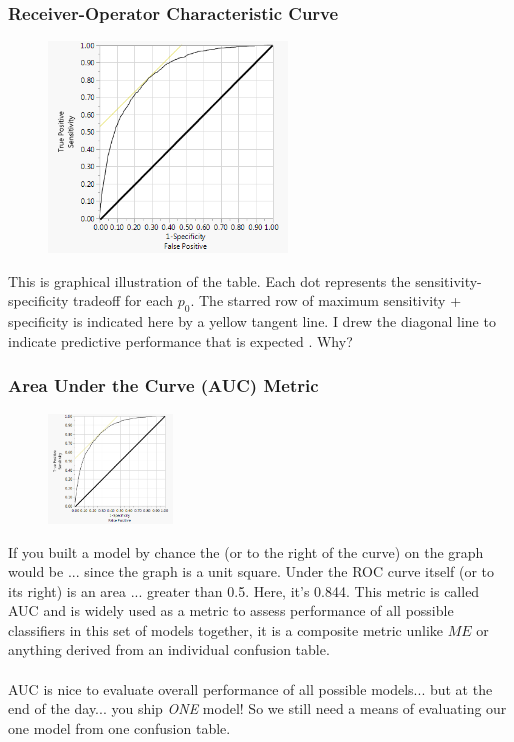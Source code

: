 \documentclass[handout]{beamer}
\begin{document}
\begin{frame}\frametitle{Receiver-Operator Characteristic Curve}

\vspace{-0.2cm}
\begin{figure}
\centering
\hspace{-0.5cm}\includegraphics[width=2.5in]{roc_curve.png}
\end{figure}

\small
\vspace{-0.3cm}
This is graphical illustration of the table. Each dot represents the sensitivity-specificity tradeoff for each $p_0$. \pause The starred row of maximum sensitivity + specificity is indicated here by a yellow tangent line. \pause I drew the diagonal line to indicate predictive performance that is expected . Why?

\end{frame}


\begin{frame}\frametitle{Area Under the Curve (AUC) Metric}

\vspace{-0.2cm}
\begin{figure}
\centering
\hspace{-0.5cm}\includegraphics[width=1.3in]{roc_curve.png}
\end{figure}

\small
\vspace{-0.3cm}
If you built a model by chance the  (or to the right of the curve) on the graph would be ...  since the graph is a unit square. Under the ROC curve itself (or to its right) is an area ... \pause greater than 0.5. Here, it's 0.844. \pause This metric is called AUC and is widely used as a metric to assess performance of all possible classifiers in this set of models together, it is a composite metric unlike $ME$ or anything derived from an individual confusion table.\\~\\

AUC is nice to evaluate overall performance of all possible models... but at the end of the day... \pause you ship \emph{ONE} model! So we still need a means of evaluating our one model from one confusion table.

\end{frame}
\end{document}
